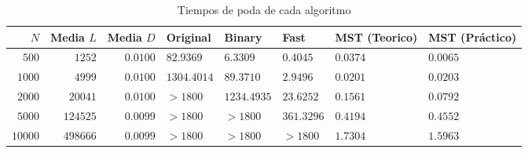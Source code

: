 \documentclass[10pt,a4paper,spanish]{article}
\numberwithin{equation}{section} %
\numberwithin{figure}{section} %
\numberwithin{table}{section} %
\begin{document}

\begin{table}[!h]
\begin{tabular}{rrrlllll}
\hline
    $N$ &    Media $L$ &   Media $D$ & Original             & Binary               & Fast                 & MST (Teorico)          & MST (Práctico)         \\
\hline
$500$ &   $1252$ & $0.0100$  & $82.9369$  & $6.3309$  & $0.4045$ & $0.0374$ & $0.0065$ \\
$1000$ & $4999$ & $0.0100$   &       $1304.4014$ & $89.3710$  & $2.9496$ & $0.0201$  & $0.0203$ \\
$2000$ &  $20041$ & $0.0100$  &       $> 1800$ & $1234.4935$ & $23.6252$ & $0.1561$  & $0.0792$  \\
$5000$ & $124525$ & $0.0099$ & $> 1800$ & $> 1800$ & $361.3296$   & $0.4194$   & $0.4552$   \\
$10000$ & $498666$ & $0.0099$ & $> 1800$ & $> 1800$ & $> 1800$ & $1.7304$   & $1.5963$    \\
\hline
\end{tabular}
\caption{Tiempos de poda de cada algoritmo}
\label{tiempopoda}
\end{table}
\end{document}

